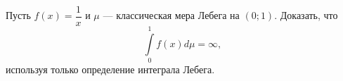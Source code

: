 \begin{task}{2}
Пусть $f(x) = \dfrac{1}{x}$ и $\mu$ — классическая мера Лебега на $(0; 1)$. Доказать, что
\[
\int\limits_0^1 f(x) d\mu = \infty,
\]
используя только определение интеграла Лебега.
\end{task}

\begin{solution} 

\end{solution}
